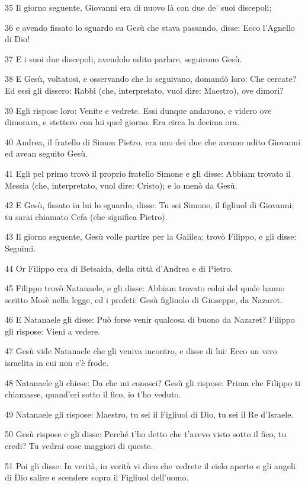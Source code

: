 \par 35 Il giorno seguente, Giovanni era di nuovo là con due de' suoi discepoli;
\par 36 e avendo fissato lo sguardo su Gesù che stava passando, disse: Ecco l'Agnello di Dio!
\par 37 E i suoi due discepoli, avendolo udito parlare, seguirono Gesù.
\par 38 E Gesù, voltatosi, e osservando che lo seguivano, domandò loro: Che cercate? Ed essi gli dissero: Rabbì (che, interpretato, vuol dire: Maestro), ove dimori?
\par 39 Egli rispose loro: Venite e vedrete. Essi dunque andarono, e videro ove dimorava, e stettero con lui quel giorno. Era circa la decima ora.
\par 40 Andrea, il fratello di Simon Pietro, era uno dei due che aveano udito Giovanni ed avean seguito Gesù.
\par 41 Egli pel primo trovò il proprio fratello Simone e gli disse: Abbiam trovato il Messia (che, interpretato, vuol dire: Cristo); e lo menò da Gesù.
\par 42 E Gesù, fissato in lui lo sguardo, disse: Tu sei Simone, il figliuol di Giovanni; tu sarai chiamato Cefa (che significa Pietro).
\par 43 Il giorno seguente, Gesù volle partire per la Galilea; trovò Filippo, e gli disse: Seguimi.
\par 44 Or Filippo era di Betsaida, della città d'Andrea e di Pietro.
\par 45 Filippo trovò Natanaele, e gli disse: Abbiam trovato colui del quale hanno scritto Mosè nella legge, ed i profeti: Gesù figliuolo di Giuseppe, da Nazaret.
\par 46 E Natanaele gli disse: Può forse venir qualcosa di buono da Nazaret? Filippo gli rispose: Vieni a vedere.
\par 47 Gesù vide Natanaele che gli veniva incontro, e disse di lui: Ecco un vero israelita in cui non c'è frode.
\par 48 Natanaele gli chiese: Da che mi conosci? Gesù gli rispose: Prima che Filippo ti chiamasse, quand'eri sotto il fico, io t'ho veduto.
\par 49 Natanaele gli rispose: Maestro, tu sei il Figliuol di Dio, tu sei il Re d'Israele.
\par 50 Gesù rispose e gli disse: Perché t'ho detto che t'avevo visto sotto il fico, tu credi? Tu vedrai cose maggiori di queste.
\par 51 Poi gli disse: In verità, in verità vi dico che vedrete il cielo aperto e gli angeli di Dio salire e scendere sopra il Figliuol dell'uomo.

